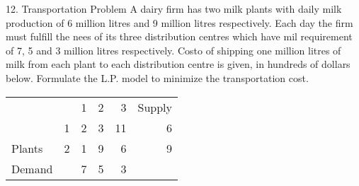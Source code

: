 \begin{frameExample}{12. Transportation Problem}{}
  A dairy firm has two milk plants with daily milk production of 6 million litres and 9 million litres respectively. Each day the firm must fulfill the nees of its three distribution centres which have mil requirement of 7, 5 and 3 million litres respectively. Costo of shipping one million litres of milk from each plant to each distribution centre is given, in hundreds of dollars below. Formulate the L.P. model to minimize the transportation cost.

  {
    \centering
   \begin{tabular}{llllrr}
 &  & 1 & 2 & 3 & Supply \\ \cline{3-5}
      & 1 & \multicolumn{1}{|l|}{2} & \multicolumn{1}{l|}{3} & \multicolumn{1}{r|}{11} & 6 \\ \cline{3-5}
     Plants & 2 & \multicolumn{1}{|l|}{1} & \multicolumn{1}{l|}{9} & \multicolumn{1}{r|}{6} & 9 \\ \cline{3-5}
Demand &  & 7 & 5 & 3 & 
\end{tabular}
    \par
  }
\end{frameExample}


